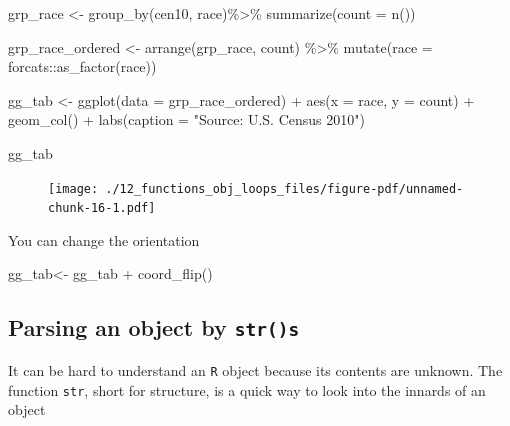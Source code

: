 \documentclass[
  letterpaper,
]{book}
\newenvironment{Shaded}{\begin{snugshade}}{\end{snugshade}}
\newcommand{\AttributeTok}[1]{\textcolor[rgb]{0.40,0.45,0.13}{#1}}
\newcommand{\FunctionTok}[1]{\textcolor[rgb]{0.28,0.35,0.67}{#1}}
\newcommand{\NormalTok}[1]{\textcolor[rgb]{0.00,0.23,0.31}{#1}}
\newcommand{\OtherTok}[1]{\textcolor[rgb]{0.00,0.23,0.31}{#1}}
\newcommand{\SpecialCharTok}[1]{\textcolor[rgb]{0.37,0.37,0.37}{#1}}
\newcommand{\StringTok}[1]{\textcolor[rgb]{0.13,0.47,0.30}{#1}}
\theoremstyle{definition}
\theoremstyle{definition}
\theoremstyle{plain}
\theoremstyle{definition}
\theoremstyle{plain}
\theoremstyle{plain}
\theoremstyle{remark}
\begin{document}
\begin{Shaded}
\begin{Highlighting}[]
\NormalTok{grp\_race }\OtherTok{\textless{}{-}} \FunctionTok{group\_by}\NormalTok{(cen10, race)}\SpecialCharTok{\%\textgreater{}\%}
  \FunctionTok{summarize}\NormalTok{(}\AttributeTok{count =} \FunctionTok{n}\NormalTok{())}

\NormalTok{grp\_race\_ordered }\OtherTok{\textless{}{-}} \FunctionTok{arrange}\NormalTok{(grp\_race, count) }\SpecialCharTok{\%\textgreater{}\%} 
  \FunctionTok{mutate}\NormalTok{(}\AttributeTok{race =}\NormalTok{ forcats}\SpecialCharTok{::}\FunctionTok{as\_factor}\NormalTok{(race))}

\NormalTok{gg\_tab }\OtherTok{\textless{}{-}} \FunctionTok{ggplot}\NormalTok{(}\AttributeTok{data =}\NormalTok{ grp\_race\_ordered) }\SpecialCharTok{+}
  \FunctionTok{aes}\NormalTok{(}\AttributeTok{x =}\NormalTok{ race, }\AttributeTok{y =}\NormalTok{ count) }\SpecialCharTok{+}
  \FunctionTok{geom\_col}\NormalTok{() }\SpecialCharTok{+}
  \FunctionTok{labs}\NormalTok{(}\AttributeTok{caption =} \StringTok{"Source: U.S. Census 2010"}\NormalTok{)}

\NormalTok{gg\_tab}
\end{Highlighting}
\end{Shaded}

\begin{figure}[H]

{\centering \texttt{[image: ./12\_functions\_obj\_loops\_files/figure-pdf/unnamed-chunk-16-1.pdf]}

}

\end{figure}

You can change the orientation

\begin{Shaded}
\begin{Highlighting}[]
\NormalTok{gg\_tab}\OtherTok{\textless{}{-}}\NormalTok{ gg\_tab }\SpecialCharTok{+} \FunctionTok{coord\_flip}\NormalTok{()}
\end{Highlighting}
\end{Shaded}

\hypertarget{parsing-an-object-by-strs}{%
\subsection{\texorpdfstring{Parsing an object by
\texttt{str()s}}{Parsing an object by str()s}}\label{parsing-an-object-by-strs}}

It can be hard to understand an \texttt{R} object because its contents
are unknown. The function \texttt{str}, short for structure, is a quick
way to look into the innards of an object
\end{document}
